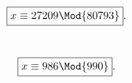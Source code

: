 \documentclass[
  coursecode={MTHE 418},
  assignmentname={Homework \homeworknumber},
  studentnumber=20053722,
  name={Bryan Hoang},
  draft,
]{
  ltxanswer%
}
\date{2022-02-28}
\begin{document}
  \begin{questions}
    \setcounter{question}{\questionnumber}
    \addtocounter{question}{-1}
    \question[10]\
    \begin{parts}
      \addtocounter{partno}{1}
      \part{}
      \begin{solution}
        \begin{equation*}
          \boxed{x \equiv 27209 \Mod{80793}}.
        \end{equation*}
      \end{solution}

      \addtocounter{partno}{1}
      \part{}
      \begin{solution}
        \begin{equation*}
          \boxed{x \equiv 986 \Mod{990}}.
        \end{equation*}
      \end{solution}
    \end{parts}
  \end{questions}
\end{document}
